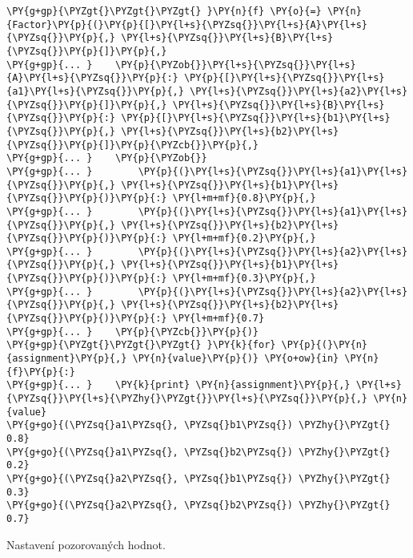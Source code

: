 \begin{fulllineitems}
\begin{fulllineitems}
\begin{Verbatim}[commandchars=\\\{\}]
\PY{g+gp}{\PYZgt{}\PYZgt{}\PYZgt{} }\PY{n}{f} \PY{o}{=} \PY{n}{Factor}\PY{p}{(}\PY{p}{[}\PY{l+s}{\PYZsq{}}\PY{l+s}{A}\PY{l+s}{\PYZsq{}}\PY{p}{,} \PY{l+s}{\PYZsq{}}\PY{l+s}{B}\PY{l+s}{\PYZsq{}}\PY{p}{]}\PY{p}{,}
\PY{g+gp}{... }    \PY{p}{\PYZob{}}\PY{l+s}{\PYZsq{}}\PY{l+s}{A}\PY{l+s}{\PYZsq{}}\PY{p}{:} \PY{p}{[}\PY{l+s}{\PYZsq{}}\PY{l+s}{a1}\PY{l+s}{\PYZsq{}}\PY{p}{,} \PY{l+s}{\PYZsq{}}\PY{l+s}{a2}\PY{l+s}{\PYZsq{}}\PY{p}{]}\PY{p}{,} \PY{l+s}{\PYZsq{}}\PY{l+s}{B}\PY{l+s}{\PYZsq{}}\PY{p}{:} \PY{p}{[}\PY{l+s}{\PYZsq{}}\PY{l+s}{b1}\PY{l+s}{\PYZsq{}}\PY{p}{,} \PY{l+s}{\PYZsq{}}\PY{l+s}{b2}\PY{l+s}{\PYZsq{}}\PY{p}{]}\PY{p}{\PYZcb{}}\PY{p}{,}
\PY{g+gp}{... }    \PY{p}{\PYZob{}}
\PY{g+gp}{... }        \PY{p}{(}\PY{l+s}{\PYZsq{}}\PY{l+s}{a1}\PY{l+s}{\PYZsq{}}\PY{p}{,} \PY{l+s}{\PYZsq{}}\PY{l+s}{b1}\PY{l+s}{\PYZsq{}}\PY{p}{)}\PY{p}{:} \PY{l+m+mf}{0.8}\PY{p}{,}
\PY{g+gp}{... }        \PY{p}{(}\PY{l+s}{\PYZsq{}}\PY{l+s}{a1}\PY{l+s}{\PYZsq{}}\PY{p}{,} \PY{l+s}{\PYZsq{}}\PY{l+s}{b2}\PY{l+s}{\PYZsq{}}\PY{p}{)}\PY{p}{:} \PY{l+m+mf}{0.2}\PY{p}{,}
\PY{g+gp}{... }        \PY{p}{(}\PY{l+s}{\PYZsq{}}\PY{l+s}{a2}\PY{l+s}{\PYZsq{}}\PY{p}{,} \PY{l+s}{\PYZsq{}}\PY{l+s}{b1}\PY{l+s}{\PYZsq{}}\PY{p}{)}\PY{p}{:} \PY{l+m+mf}{0.3}\PY{p}{,}
\PY{g+gp}{... }        \PY{p}{(}\PY{l+s}{\PYZsq{}}\PY{l+s}{a2}\PY{l+s}{\PYZsq{}}\PY{p}{,} \PY{l+s}{\PYZsq{}}\PY{l+s}{b2}\PY{l+s}{\PYZsq{}}\PY{p}{)}\PY{p}{:} \PY{l+m+mf}{0.7}
\PY{g+gp}{... }    \PY{p}{\PYZcb{}}\PY{p}{)}
\PY{g+gp}{\PYZgt{}\PYZgt{}\PYZgt{} }\PY{k}{for} \PY{p}{(}\PY{n}{assignment}\PY{p}{,} \PY{n}{value}\PY{p}{)} \PY{o+ow}{in} \PY{n}{f}\PY{p}{:}
\PY{g+gp}{... }    \PY{k}{print} \PY{n}{assignment}\PY{p}{,} \PY{l+s}{\PYZsq{}}\PY{l+s}{\PYZhy{}\PYZgt{}}\PY{l+s}{\PYZsq{}}\PY{p}{,} \PY{n}{value}
\PY{g+go}{(\PYZsq{}a1\PYZsq{}, \PYZsq{}b1\PYZsq{}) \PYZhy{}\PYZgt{} 0.8}
\PY{g+go}{(\PYZsq{}a1\PYZsq{}, \PYZsq{}b2\PYZsq{}) \PYZhy{}\PYZgt{} 0.2}
\PY{g+go}{(\PYZsq{}a2\PYZsq{}, \PYZsq{}b1\PYZsq{}) \PYZhy{}\PYZgt{} 0.3}
\PY{g+go}{(\PYZsq{}a2\PYZsq{}, \PYZsq{}b2\PYZsq{}) \PYZhy{}\PYZgt{} 0.7}
\end{Verbatim}

\end{fulllineitems}


\begin{fulllineitems}
\label{alex.infer:alex.infer.factor.Factor.observed}
Nastavení pozorovaných hodnot.


\end{fulllineitems}
\end{fulllineitems}

